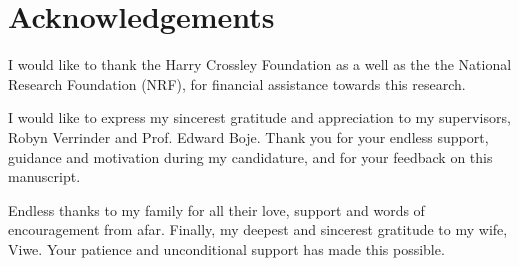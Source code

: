 \documentclass[a4paper, 12pt, oneside, openright, parskip=full]{book}
\newcommand{\nrf}									   
{	
The financial assistance of the National Research Foundation (NRF) towards this research is hereby acknowledged. Opinions expressed and conclusions arrived at, are those of the author and are not necessarily to be attributed to the NRF.

}
\begin{document}
\chapter{Acknowledgements}		
\label{ch:ack}
I would like to thank the Harry Crossley Foundation as a well as the the National Research Foundation (NRF), for financial assistance towards this research.

I would like to express my sincerest gratitude and appreciation to my supervisors, Robyn Verrinder and Prof. Edward Boje. Thank you for your endless support, guidance and motivation during my candidature, and for your feedback on this manuscript.

Endless thanks to my family for all their love, support and words of encouragement from afar. Finally, my deepest and sincerest gratitude to my wife, Viwe. Your patience and unconditional support has made this possible.
\setcounter{tocdepth}{5}
\setcounter{secnumdepth}{5}
 
\tableofcontents


\listoffigures

\listoftables

\end{document}
